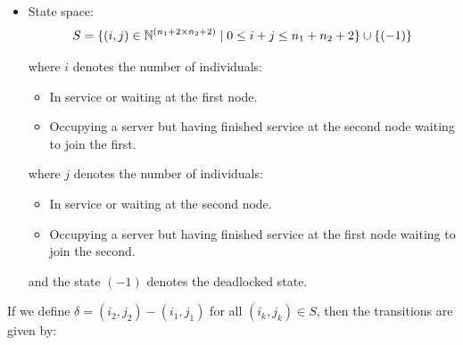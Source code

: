 \documentclass{article}
\begin{document}
\begin{itemize}
    \item State space:
        \[S = \{(i,j)\in\mathbb{N}^{(n_1+2\times n_2+2)} \nonscript\; | \nonscript\; 0 \leq i + j \leq n_1 + n_2 + 2
        \}\cup\{(-1)\}\]

        where \(i\) denotes the number of individuals:
            \begin{itemize}
                \item In service or waiting at the first node.
                \item Occupying a server but having finished service at the
                    second node waiting to join the first.
            \end{itemize}
        where \(j\) denotes the number of individuals:
            \begin{itemize}
                \item In service or waiting at the second node.
                \item Occupying a server but having finished service at the
                    first node waiting to join the second.
            \end{itemize}
        and the state $(-1)$ denotes the deadlocked state.
\end{itemize}

If we define $\delta = (i_2, j_2) - (i_1, j_1)$ for all $(i_k, j_k) \in S$, then the transitions are given by:
\end{document}
